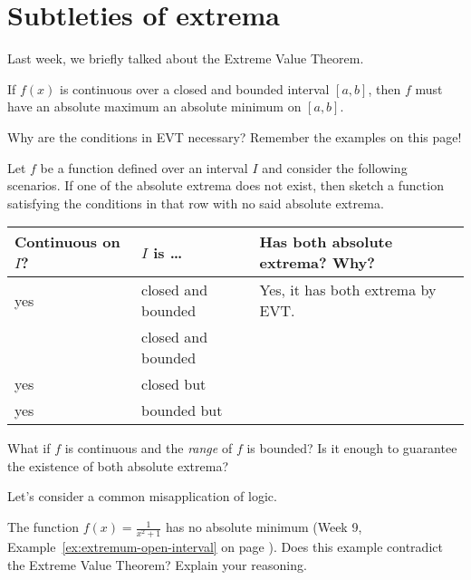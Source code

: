 \documentclass[../main.tex]{subfiles}
\begin{document}
 \section{Subtleties of extrema}
Last week, we briefly talked about the Extreme Value Theorem.
\begin{mdframed}[style=withref-compact]
  If \(f(x)\) is continuous over a closed and bounded interval \([a,b]\), then \(f\) must have an absolute maximum  an absolute minimum on \([a,b]\).

\end{mdframed}

Why are the conditions  in EVT necessary? Remember the examples on this page!

\begin{example}
  Let \(f\) be a function defined over an interval \(I\) and consider the following scenarios. If one of the absolute extrema does not exist, then sketch a function satisfying the conditions in that row with no said absolute extrema.

  \begin{center}
    \begin{tabular}{p{1in}|l|p{4in}}
      \parbox{1in}{Continuous\\on \(I\)?} & \(I\) is \ldots{} & Has both absolute extrema? Why? \\ \midrule
      yes & closed and bounded & Yes, it has both extrema by EVT. \\\midrule
       & closed and bounded & \\[1in] \midrule
      yes & closed but  & \\[1in] \midrule
      yes & bounded but  & \\[1in]
    \end{tabular}
  \end{center}

  \faComment{} What if \(f\) is continuous and the \emph{range} of \(f\) is bounded? Is it enough to guarantee the existence of both absolute extrema? 

\end{example}

\medskip{}
Let's consider a common misapplication of logic.
\begin{example}
  The function \(f(x) = \frac{1}{x^{2} + 1}\) has no absolute minimum (Week 9, Example~\ref{ex:extremum-open-interval} on page \pageref{ex:extremum-open-interval}). Does this example contradict the Extreme Value Theorem? Explain your reasoning.
  \vfill{}
  \clearpage
\end{example}
\end{document}
